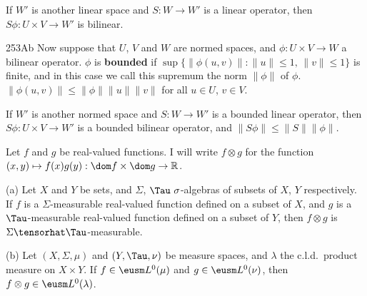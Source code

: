 If $W'$ is another linear space and
$S:W\to W'$ is a linear operator, then $S\phi:U\times V\to W'$ is
bilinear.

\spheader 253Ab Now suppose that $U$, $V$ and $W$ are
normed spaces, and $\phi:U\times V\to W$ a bilinear operator.
 $\phi$ is {\bf bounded} if
$\sup\{\|\phi(u,v)\|:\|u\|\le 1,\,\|v\|\le 1\}$ is finite, and in this
case we call this supremum the
norm $\|\phi\|$ of $\phi$.    
$\|\phi(u,v)\|\le\|\phi\|\|u\|\|v\|$ for all $u\in U$, $v\in
V$.

If $W'$ is another normed space and $S:W\to W'$ is a bounded linear
operator, then $S\phi:U\times V\to W'$ is a bounded bilinear operator,
and $\|S\phi\|\le\|S\|\|\phi\|$.

   Let $f$ and $g$ be
real-valued functions.   I will write $f\otimes g$ for the function
$(x,y)\mapsto f(x)g(y):\dom f\times\dom g\to\Bbb R$.

(a) Let $X$ and $Y$ be sets, and $\Sigma$, $\Tau\,\,\sigma$-algebras of
subsets of $X$, $Y$ respectively.   If $f$ is a $\Sigma$-measurable
real-valued function defined on a subset of $X$, and $g$ is a
$\Tau$-measurable real-valued function defined on a subset of $Y$, then
$f\otimes g$ is
$\Sigma\tensorhat\Tau$-measurable.

(b) Let $(X,\Sigma,\mu)$ and $(Y,\Tau,\nu)$ be measure spaces, and
$\lambda$ the c.l.d.\ product measure on $X\times Y$.  If
$f\in\eusm L^0(\mu)$ and $g\in\eusm L^0(\nu)$, then
$f\otimes g\in\eusm L^0(\lambda)$.


